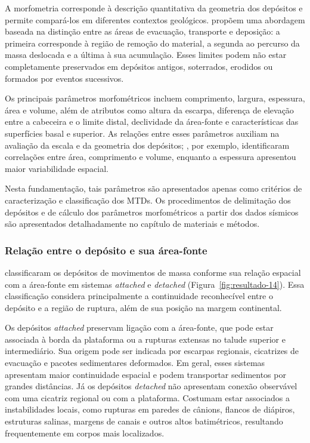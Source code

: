 A morfometria corresponde à descrição quantitativa da geometria dos depósitos e permite compará-los em diferentes contextos geológicos.  propõem uma abordagem baseada na distinção entre as áreas de evacuação, transporte e deposição: a primeira corresponde à região de remoção do material, a segunda ao percurso da massa deslocada e a última à sua acumulação. Esses limites podem não estar completamente preservados em depósitos antigos, soterrados, erodidos ou formados por eventos sucessivos.

Os principais parâmetros morfométricos incluem comprimento, largura, espessura, área e volume, além de atributos como altura da escarpa, diferença de elevação entre a cabeceira e o limite distal, declividade da área-fonte e características das superfícies basal e superior. As relações entre esses parâmetros auxiliam na avaliação da escala e da geometria dos depósitos; , por exemplo, identificaram correlações entre área, comprimento e volume, enquanto a espessura apresentou maior variabilidade espacial.

Nesta fundamentação, tais parâmetros são apresentados apenas como critérios de caracterização e classificação dos MTDs. Os procedimentos de delimitação dos depósitos e de cálculo dos parâmetros morfométricos a partir dos dados sísmicos são apresentados detalhadamente no capítulo de materiais e métodos.

\subsubsection{Relação entre o depósito e sua área-fonte}\label{sec:2-3-4-2}

 classificaram os depósitos de movimentos de massa conforme sua relação espacial com a área-fonte em sistemas \textit{attached} e \textit{detached} (Figura~\ref{fig:resultado-14}). Essa classificação considera principalmente a continuidade reconhecível entre o depósito e a região de ruptura, além de sua posição na margem continental.

Os depósitos \textit{attached} preservam ligação com a área-fonte, que pode estar associada à borda da plataforma ou a rupturas extensas no talude superior e intermediário. Sua origem pode ser indicada por escarpas regionais, cicatrizes de evacuação e pacotes sedimentares deformados. Em geral, esses sistemas apresentam maior continuidade espacial e podem transportar sedimentos por grandes distâncias. Já os depósitos \textit{detached} não apresentam conexão observável com uma cicatriz regional ou com a plataforma. Costumam estar associados a instabilidades locais, como rupturas em paredes de cânions, flancos de diápiros, estruturas salinas, margens de canais e outros altos batimétricos, resultando frequentemente em corpos mais localizados.

